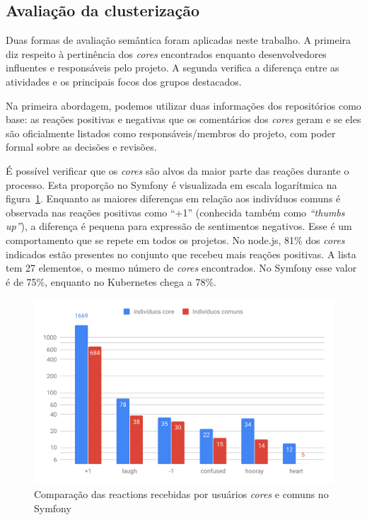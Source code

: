 \documentclass[12pt,openany,oneside,a4paper,english,brazil]{abntbibufjf}
\begin{document}
  \subsection{Avaliação da clusterização}

  Duas formas de avaliação semântica foram aplicadas neste trabalho. A primeira diz respeito à pertinência dos \textit{cores} encontrados enquanto desenvolvedores influentes e responsáveis pelo projeto. A segunda verifica a diferença entre as atividades e os principais focos dos grupos destacados.

  Na primeira abordagem, podemos utilizar duas informações dos repositórios como base: as reações positivas e negativas que os comentários dos \textit{cores} geram e se eles são oficialmente listados como responsáveis/membros do projeto, com poder formal sobre as decisões e revisões.

  É possível verificar que os \textit{cores} são alvos da maior parte das reações durante o processo. Esta proporção no Symfony é visualizada em escala logarítmica na figura~\ref{fig:chart-reactions-symfony}.  Enquanto as maiores diferenças em relação aos indivíduos comuns é observada nas reações positivas como ``+1'' (conhecida também como \textit{``thumbs up''}), a diferença é pequena para expressão de sentimentos negativos. Esse é um comportamento que se repete em todos os projetos. No node.js, 81\% dos \textit{cores} indicados estão presentes no conjunto que recebeu mais reações positivas. A lista tem 27 elementos, o mesmo número de \textit{cores} encontrados. No Symfony esse valor é de 75\%, enquanto no Kubernetes chega a 78\%.


  \begin{figure}[htbp]
    \centerline{\includegraphics[width=\linewidth]{chart-reactions-symfony}}
    \caption{Comparação das reactions recebidas por usuários \textit{cores} e comuns no Symfony}
    \label{fig:chart-reactions-symfony}
  \end{figure}
\end{document}
